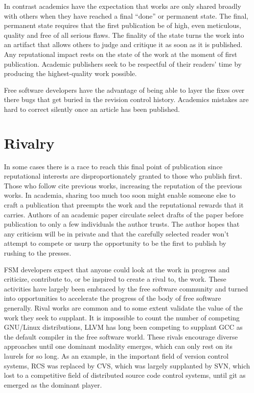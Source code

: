 \documentclass[
	fontsize=10pt, %
	twoside=false, %
	secnumdepth=1, %
]{kaobook}
\begin{document}
In contrast academics have the expectation that works are only shared
broadly with others when they have reached a final “done” or permanent
state. The final, permanent state requires that the first publication
be of high, even meticulous, quality and free of all serious
flaws. The finality of the state turns the work into an artifact that
allows others to judge and critique it as soon as it is published. Any
reputational impact rests on the state of the work at the moment of
first publication. Academic publishers seek to be respectful of their
readers’ time by producing the highest-quality work possible.

Free software developers have the advantage of being able to layer the
fixes over there bugs that get buried in the revision control
history. Academics mistakes are hard to correct silently once an
article has been published.

\section{Rivalry}

In some cases there is a race to reach this final point of publication
since reputational interests are disproportionately granted to those
who publish first. Those who follow cite previous works, increasing
the reputation of the previous works. In academia, sharing too much
too soon might enable someone else to craft a publication that
preempts the work and the reputational rewards that it
carries. Authors of an academic paper circulate select drafts of the
paper before publication to only a few individuals the author
trusts. The author hopes that any criticism will be in private and
that the carefully selected reader won’t attempt to compete or usurp
the opportunity to be the first to publish by rushing to the presses.

FSM developers expect that anyone could look at the work in progress
and criticize, contribute to, or be inspired to create a rival to, the
work. These activities have largely been embraced by the free software
community and turned into opportunities to accelerate the progress of
the body of free software generally. Rival works are common and to
some extent validate the value of the work they seek to supplant. It
is impossible to count the number of competing GNU/Linux
distributions, LLVM has long been competing to supplant GCC as the
default compiler in the free software world. These rivals encourage
diverse approaches until one dominant modality emerges, which can only
rest on its laurels for so long. As an example, in the important field
of version control systems, RCS was replaced by CVS, which was largely
supplanted by SVN, which lost to a competitive field of distributed
source code control systems, until git as emerged as the dominant
player.
\end{document}
